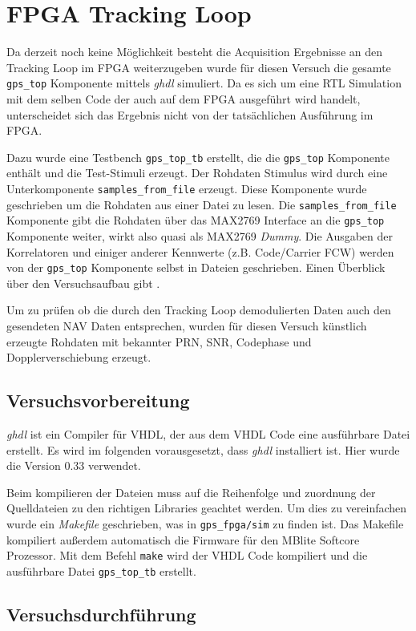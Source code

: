 \section{FPGA Tracking Loop}
Da derzeit noch keine Möglichkeit besteht die Acquisition Ergebnisse an den Tracking Loop im FPGA weiterzugeben wurde für diesen Versuch die gesamte \lstinline$gps_top$ Komponente mittels \emph{ghdl} simuliert. Da es sich um eine \gls{RTL} Simulation mit dem selben Code der auch auf dem FPGA ausgeführt wird handelt, unterscheidet sich das Ergebnis nicht von der tatsächlichen Ausführung im FPGA.

Dazu wurde eine Testbench \lstinline$gps_top_tb$ erstellt, die die \lstinline$gps_top$ Komponente enthält und die Test-Stimuli erzeugt. Der Rohdaten Stimulus wird durch eine Unterkomponente \lstinline$samples_from_file$ erzeugt. Diese Komponente wurde geschrieben um die Rohdaten aus einer Datei zu lesen. Die \lstinline$samples_from_file$ Komponente gibt die Rohdaten über das MAX2769 Interface an die \lstinline$gps_top$ Komponente weiter, wirkt also quasi als MAX2769 \emph{Dummy}. Die Ausgaben der Korrelatoren und einiger anderer Kennwerte (z.B. Code/Carrier FCW) werden von der \lstinline$gps_top$ Komponente selbst in Dateien geschrieben. Einen Überblick über den Versuchsaufbau gibt .


Um zu prüfen ob die durch den Tracking Loop demodulierten Daten auch den gesendeten NAV Daten entsprechen, wurden für diesen Versuch künstlich erzeugte Rohdaten mit bekannter PRN, SNR, Codephase und Dopplerverschiebung erzeugt. 

\subsection{Versuchsvorbereitung}
\emph{ghdl} ist ein Compiler für VHDL, der aus dem VHDL Code eine ausführbare Datei erstellt. Es wird im folgenden vorausgesetzt, dass \emph{ghdl} installiert ist. Hier wurde die Version 0.33 verwendet.

Beim kompilieren der Dateien muss auf die Reihenfolge und zuordnung der Quelldateien zu den richtigen Libraries geachtet werden. Um dies zu vereinfachen wurde ein \emph{Makefile} geschrieben, was in \lstinline$gps_fpga/sim$ zu finden ist. Das Makefile kompiliert außerdem automatisch die Firmware für den MBlite Softcore Prozessor. Mit dem Befehl \lstinline$make$ wird der VHDL Code kompiliert und die ausführbare Datei \lstinline$gps_top_tb$ erstellt. 


\subsection{Versuchsdurchführung}
